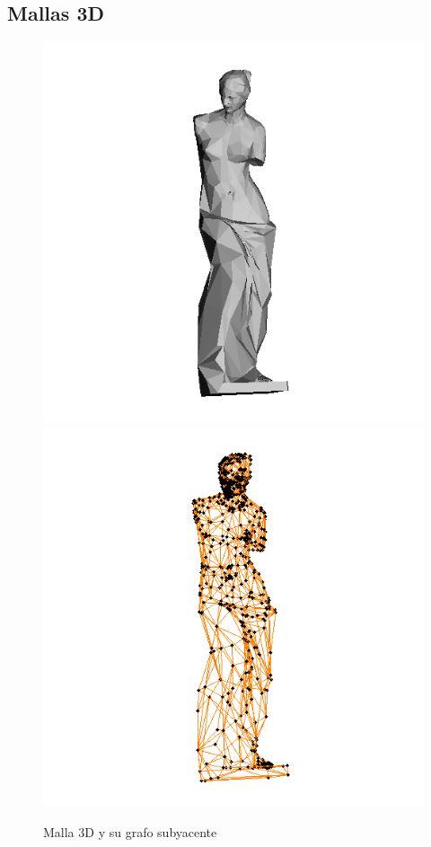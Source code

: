 \documentclass[10pt, a4paper, twocolumn]{article} %
\begin{document}
\newpage

\subsection{Mallas 3D}

\begin{figure}
	\includegraphics[scale=.21]{venusv_solid.jpg} %
	\includegraphics[scale=.21]{venusv_graph.jpg} %
	\caption{Malla 3D y su grafo subyacente}%
	\label{fig:venus} %
\end{figure}
\end{document}
